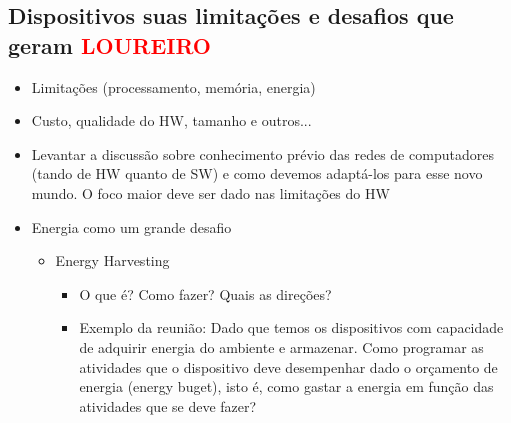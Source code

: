   \subsection{Dispositivos suas limitações e desafios que geram 
\textcolor{red}{LOUREIRO}}
      \begin{itemize}
	\item Limitações (processamento, memória, energia)
	\item Custo, qualidade do HW, tamanho e outros...
	\item Levantar a discussão sobre conhecimento prévio das redes de 
computadores (tando de HW quanto de SW) e como devemos adaptá-los para esse 
novo mundo. O foco maior deve ser dado nas limitações do HW
	\item Energia como um grande desafio
	  \begin{itemize}
	    \item Energy Harvesting
	      \begin{itemize}
		\item O que é? Como fazer? Quais as direções?
		\item Exemplo da reunião: Dado que temos os dispositivos com 
capacidade de adquirir energia do ambiente e armazenar. Como programar as 
atividades que o dispositivo deve desempenhar dado o orçamento de energia 
(energy buget), isto é, como gastar a energia em função das atividades que se 
deve fazer?
	      \end{itemize}

	  \end{itemize}

      \end{itemize}
